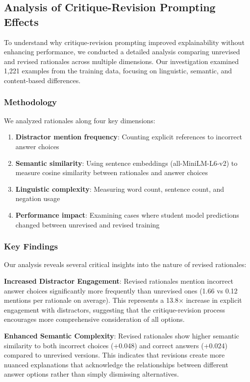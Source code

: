 \subsection{Analysis of Critique-Revision Prompting Effects}

To understand why critique-revision prompting improved explainability without enhancing performance, we conducted a detailed analysis comparing unrevised and revised rationales across multiple dimensions. Our investigation examined 1,221 examples from the training data, focusing on linguistic, semantic, and content-based differences.

\subsubsection{Methodology}

We analyzed rationales along four key dimensions:
\begin{enumerate}
    \item \textbf{Distractor mention frequency}: Counting explicit references to incorrect answer choices
    \item \textbf{Semantic similarity}: Using sentence embeddings (all-MiniLM-L6-v2) to measure cosine similarity between rationales and answer choices
    \item \textbf{Linguistic complexity}: Measuring word count, sentence count, and negation usage
    \item \textbf{Performance impact}: Examining cases where student model predictions changed between unrevised and revised training
\end{enumerate}

\subsubsection{Key Findings}

Our analysis reveals several critical insights into the nature of revised rationales:

\textbf{Increased Distractor Engagement}: Revised rationales mention incorrect answer choices significantly more frequently than unrevised ones (1.66 vs 0.12 mentions per rationale on average). This represents a 13.8× increase in explicit engagement with distractors, suggesting that the critique-revision process encourages more comprehensive consideration of all options.

\textbf{Enhanced Semantic Complexity}: Revised rationales show higher semantic similarity to both incorrect choices (+0.048) and correct answers (+0.024) compared to unrevised versions. This indicates that revisions create more nuanced explanations that acknowledge the relationships between different answer options rather than simply dismissing alternatives.

